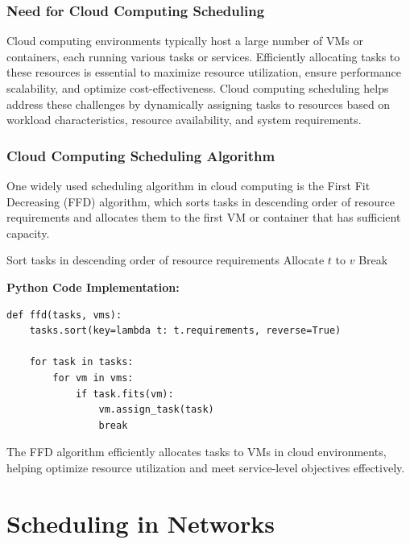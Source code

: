 \documentclass[12pt]{book} %
\begin{document}
\subsubsection{Need for Cloud Computing Scheduling}

Cloud computing environments typically host a large number of VMs or containers, each running various tasks or services. Efficiently allocating tasks to these resources is essential to maximize resource utilization, ensure performance scalability, and optimize cost-effectiveness. Cloud computing scheduling helps address these challenges by dynamically assigning tasks to resources based on workload characteristics, resource availability, and system requirements.


\subsubsection{Cloud Computing Scheduling Algorithm}

One widely used scheduling algorithm in cloud computing is the First Fit Decreasing (FFD) algorithm, which sorts tasks in descending order of resource requirements and allocates them to the first VM or container that has sufficient capacity.
\FloatBarrier
\begin{algorithm}[H]
\caption{First Fit Decreasing (FFD) Algorithm}\label{alg:ffd}
\begin{algorithmic}[1]
\State Sort tasks in descending order of resource requirements
            \State Allocate $t$ to $v$
            \State Break
        \EndIf
    \EndFor
\EndFor
\EndProcedure
\end{algorithmic}
\end{algorithm}
\FloatBarrier
\textbf{Python Code Implementation:}
\FloatBarrier
\begin{lstlisting}
def ffd(tasks, vms):
    tasks.sort(key=lambda t: t.requirements, reverse=True)
    
    for task in tasks:
        for vm in vms:
            if task.fits(vm):
                vm.assign_task(task)
                break
\end{lstlisting}
\FloatBarrier
The FFD algorithm efficiently allocates tasks to VMs in cloud environments, helping optimize resource utilization and meet service-level objectives effectively.


\section{Scheduling in Networks}
\end{document}
